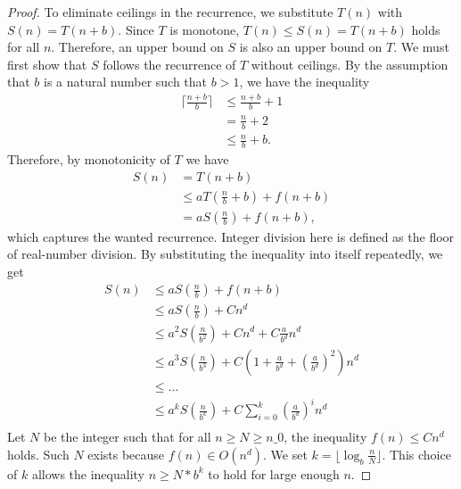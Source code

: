 \begin{proof}
    \leanok
    To eliminate ceilings in the recurrence, we substitute $T(n)$ with 
    $S(n) = T(n+b)$. Since $T$ is monotone, $T(n) \leq S(n) = T(n+b)$ holds 
    for all $n$. Therefore, an upper bound on $S$ is also an upper bound on 
    $T$. We must first show that $S$ follows the recurrence of $T$ without 
    ceilings. By the assumption that $b$ is a natural number such that $b > 1$, 
    we have the inequality 
    \begin{align*}
        \lceil \frac{n+b}{b} \rceil &\leq \frac{n+b}{b} + 1 \\
                                    &=    \frac{n}{b} + 2 \\
                                    &\leq \frac{n}{b} + b.
    \end{align*}
    Therefore, by monotonicity of $T$ we have 
    \begin{align*} 
        S(n)  &= T(n+b) \\
              &\leq a T(\frac{n}{b} + b) + f(n+b) \\
              &= a S(\frac{n}{b}) + f(n+b),
    \end{align*}
    which captures the wanted recurrence. Integer division here is defined as 
    the floor of real-number division.
    By substituting the inequality into itself repeatedly, we get
    \begin{align}
        \label{eq:s_rec}
        S(n) &\leq a S(\frac{n}{b}) + f(n + b) \\
             &\leq a S(\frac{n}{b}) + C n^d \\
             &\leq a^2 S(\frac{n}{b^2}) + C n^d + C \frac{a}{b^d} n^d \\
             &\leq a^3 S(\frac{n}{b^3}) + C (1 + \frac{a}{b^d} + 
                                            (\frac{a}{b^d})^2) n^d \\
             &\leq \dots \\
             &\leq a^k S(\frac{n}{b^k}) + C \sum_{i=0}^k 
                                                    (\frac{a}{b^d})^i n^d \\
    \end{align}
    Let $N$ be the integer such that for all $n \geq N \geq n\_0$, the 
    inequality $f(n) \leq C n^d$ holds. Such $N$ exists because 
    $f(n) \in O(n^d)$. We set $k = \lfloor \log_b{\frac{n}{N}} \rfloor$. 
    This choice of $k$ allows the inequality $n \geq N * b^k$ to hold for 
    large enough $n$. 


\end{proof}

